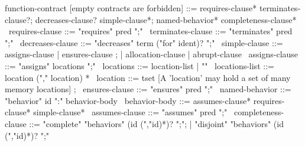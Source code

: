 \begin{syntax}
  function-contract [empty contracts are forbidden] ::= requires-clause* terminates-clause?;
                        decreases-clause? simple-clause*;
                        named-behavior* completeness-clause*
  \
  requires-clause ::= "requires" pred ";"
  \
  terminates-clause ::= "terminates" pred ";"
  \
  decreases-clause ::= "decreases" term ("for" ident)? ";"
  \
  simple-clause ::= assigns-clause | ensures-clause ;
                | allocation-clause | abrupt-clause 
  \
  assigns-clause ::= "assigns" locations ";"
  \
  locations ::= location-list | "\nothing"
  \
  locations-list ::= location ("," location) *
  \
  location ::= tset [A 'location' may hold a set of many memory locations] ;
  \
  ensures-clause ::= "ensures" pred ";"
  \
  named-behavior ::= "behavior" id ":" behavior-body
  \
  behavior-body ::= assumes-clause* requires-clause* simple-clause* 
  \
  assumes-clause ::= "assumes" pred ";"
  \
  completeness-clause ::= "complete" "behaviors" (id (","id)*)? ";";
     | "disjoint" "behaviors" (id (","id)*)? ";"
\end{syntax}
